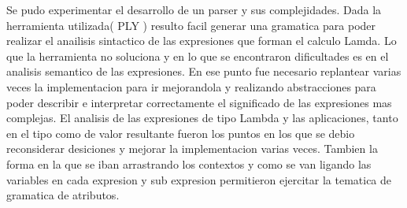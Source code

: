 Se pudo experimentar el desarrollo de un parser y sus complejidades. Dada la herramienta utilizada( PLY ) resulto facil generar una gramatica para poder realizar el anailisis sintactico de las expresiones que forman el calculo Lamda. Lo que la herramienta no soluciona y en lo que se encontraron dificultades es en el analisis semantico de las expresiones.  En ese punto fue necesario replantear varias veces la implementacion para ir mejorandola y realizando abstracciones para poder describir e interpretar correctamente el significado de las expresiones mas complejas. El analisis de las expresiones de tipo Lambda y las aplicaciones, tanto en el tipo como de valor resultante fueron los puntos en los que se debio reconsiderar desiciones y mejorar la implementacion varias veces. Tambien la forma en la que se iban arrastrando los contextos y como se van ligando las variables en cada expresion y sub expresion permitieron ejercitar la tematica de gramatica de atributos. 
